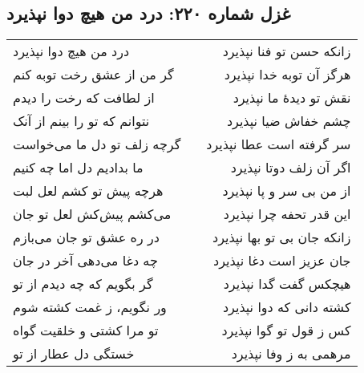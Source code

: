 \begin{center}
\section*{غزل شماره ۲۲۰: درد من هیچ دوا نپذیرد}
\label{sec:220}
\begin{longtable}{l p{0.5cm} r}
درد من هیچ دوا نپذیرد
&&
زانکه حسن تو فنا نپذیرد
\\
گر من از عشق رخت توبه کنم
&&
هرگز آن توبه خدا نپذیرد
\\
از لطافت که رخت را دیدم
&&
نقش تو دیدهٔ ما نپذیرد
\\
نتوانم که تو را بینم از آنک
&&
چشم خفاش ضیا نپذیرد
\\
گرچه زلف تو دل ما می‌خواست
&&
سر گرفته است عطا نپذیرد
\\
ما بدادیم دل اما چه کنیم
&&
اگر آن زلف دوتا نپذیرد
\\
هرچه پیش تو کشم لعل لبت
&&
از من بی سر و پا نپذیرد
\\
می‌کشم پیش‌کش لعل تو جان
&&
این قدر تحفه چرا نپذیرد
\\
در ره عشق تو جان می‌بازم
&&
زانکه جان بی تو بها نپذیرد
\\
چه دغا می‌دهی آخر در جان
&&
جان عزیز است دغا نپذیرد
\\
گر بگویم که چه دیدم از تو
&&
هیچکس گفت گدا نپذیرد
\\
ور نگویم، ز غمت کشته شوم
&&
کشته دانی که دوا نپذیرد
\\
تو مرا کشتی و خلقیت گواه
&&
کس ز قول تو گوا نپذیرد
\\
خستگی دل عطار از تو
&&
مرهمی به ز وفا نپذیرد
\\
\end{longtable}
\end{center}
